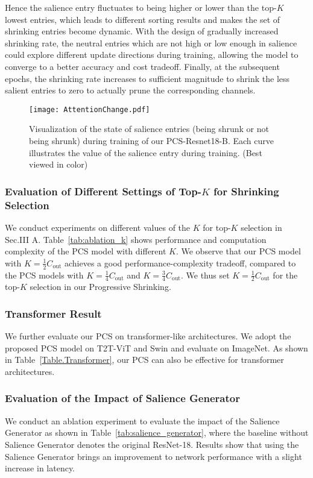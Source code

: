 \documentclass[lettersize,journal]{IEEEtran}
\begin{document}
Hence the salience entry fluctuates to being higher or lower than the top-$K$ lowest entries, which leads to different sorting results and makes the set of shrinking entries become dynamic. With the design of gradually increased shrinking rate, the neutral entries which are not high or low enough in salience could explore different update directions during training, allowing the model to converge to a better accuracy and cost tradeoff. Finally, at the subsequent epochs, 
the shrinking rate increases to sufficient magnitude to shrink the less salient entries to zero to actually prune the corresponding channels. 

\begin{figure}[t]
  \centering
  \texttt{[image: AttentionChange.pdf]}
  \caption{
  Visualization of the state of salience entries (being shrunk or not being shrunk) during training of our PCS-Resnet18-B. Each curve illustrates the value of the salience entry  during training. (Best viewed in color)}
  \label{Fig: AttentionChange}  
  \vspace{-5mm}
\end{figure} 


\subsubsection{Evaluation of Different Settings of Top-$K$ for Shrinking Selection}
We conduct experiments on different values of the $K$ for top-$K$ selection in Sec.III A. Table~\ref{tab:ablation_k} shows performance and computation complexity of the PCS model with different $K$. We observe that our PCS model with $K = \frac{1}{2}C_\text{out}$ achieves a good performance-complexity tradeoff, compared to the PCS models with $K = \frac{1}{4}C_\text{out}$ and $K = \frac{3}{4}C_\text{out}$. We thus set $K = \frac{1}{2}C_\text{out}$ for the top-$K$ selection in our Progressive Shrinking.


\subsubsection{Transformer Result }
We further evaluate our PCS on transformer-like architectures. We adopt the proposed PCS model on T2T-ViT \cite{Yuan_2021_ICCV} and Swin \cite{Liu_2021_ICCV} and evaluate on ImageNet. 
As shown in Table~\ref{Table.Transformer}, our PCS can also be effective for transformer architectures. 


\subsubsection{Evaluation of the Impact of Salience Generator }
We conduct an ablation experiment to evaluate the impact of the Salience Generator as shown in Table~\ref{tab:salience_generator}, where the baseline without Salience Generator denotes the original ResNet-18. Results show that using the Salience Generator brings an improvement to network performance with a slight increase in latency.
\end{document}
